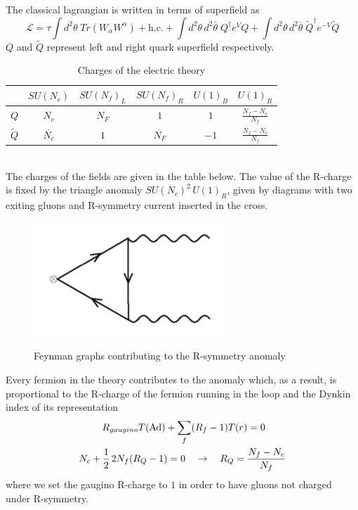 The classical lagrangian is written in terms of superfield as
\begin{equation}
 \mathcal{L} = \tau \int d^2 \theta \; Tr ( W_{\alpha} W^{\alpha} ) + \mathrm{h.c.} + 
 \int d^2 \theta \, d^2 \bar{\theta} \;  {Q}^{\dagger} e^{ V} Q +
 \int d^2 \theta \, d^2 \bar{\theta} \; {\tilde{Q}^{\dagger}} e^{- V} \tilde{Q}
 \end{equation} 
$Q$ and $\tilde{Q}$ represent left and right quark superfield respectively.
\begin{table}[h!]
 \begin{tabular}{c | c |  c c c c }
 & $SU(N_c) $& $SU(N_f)_L$  &$SU(N_f)_R $  & $U(1)_B$ &  $U(1)_R$ \\
\hline
$Q$ & $N_c$ & $N_F$ & $1$   &  $1$  & $ \frac{N_f - N_c}{N_f}$  \\
$\tilde{Q}$ &$\overline{N_c} $ &  $1$ & $\overline{ N_F}$   & $-1$   &  $\frac{N_f - N_c}{N_f}$   \\	 
 \end{tabular}
	\centering
 \caption{Charges of the electric theory}
 \label{tab:suN_elect_charge}
\end{table}
\\
The charges of the fields are given in the table below.
The value of the R-charge is fixed by the triangle anomaly $SU(N_c)^2 \, U(1)_R $, given by diagrams with two exiting gluons and R-symmetry current inserted in the cross.
\begin{figure}
\centering
\includegraphics[scale=0.6]{r-symm_anomlay.png}
\label{fig:r_symm_triangle_anom}
\caption{Feynman graphs contributing to the R-symmetry anomaly}

\end{figure}
Every fermion in the theory contributes to the anomaly which, as a result, is proportional to the R-charge of the fermion running in the loop and the Dynkin index of its representation
\begin{align*}
R_{gaugino} T (\hbox{Ad}) + \sum_{ f} (& R_{f} - 1)  T(r)   = 0 \\
N_c + \frac{1}{2}\,  2 N_f (R_Q -1)  = 0 \quad & \rightarrow \quad R_Q = \frac{N_f - N_c}{N_f}
\end{align*}
where we set the gaugino R-charge to $1$ in order to have gluons not charged under R-symmetry.

